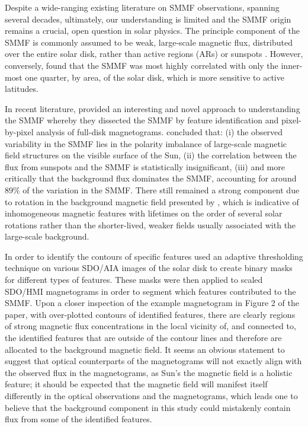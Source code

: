 Despite a wide-ranging existing literature on SMMF observations, spanning several decades, ultimately, our understanding is limited and the SMMF origin remains a crucial, open question in solar physics. The principle component of the SMMF is commonly assumed to be weak, large-scale magnetic flux, distributed over the entire solar disk, rather than active regions (ARs) or sunspots \citep{severny_time_1971, scherrer_mean_1977, xiang_ensemble_2016}. However, conversely, \citet{scherrer_mean_1972} found that the SMMF was most highly correlated with only the inner-most one quarter, by area, of the solar disk, which is more sensitive to active latitudes.

In recent literature, \citet{bose_variability_2018} provided an interesting and novel approach to understanding the SMMF whereby they dissected the SMMF by feature identification and pixel-by-pixel analysis of full-disk magnetograms. \citet{bose_variability_2018} concluded that: (i) the observed variability in the SMMF lies in the polarity imbalance of large-scale magnetic field structures on the visible surface of the Sun, (ii) the correlation between the flux from sunspots and the SMMF is statistically insignificant, (iii) and more critically that the background flux dominates the SMMF, accounting for around $89 \%$ of the variation in the SMMF. There still remained a strong component due to rotation in the background magnetic field presented by \citet{bose_variability_2018}, which is indicative of inhomogeneous magnetic features with lifetimes on the order of several solar rotations rather than the shorter-lived, weaker fields usually associated with the large-scale background. 

In order to identify the contours of specific features \citet{bose_variability_2018} used an adaptive thresholding technique on various SDO/AIA images of the solar disk to create binary masks for different types of features. These masks were then applied to scaled SDO/HMI magnetograms in order to segment which features contributed to the SMMF. Upon a closer inspection of the example magnetogram in Figure 2 of the paper, with over-plotted contours of identified features, there are clearly regions of strong magnetic flux concentrations in the local vicinity of, and connected to, the identified features that are outside of the contour lines and therefore are allocated to the background magnetic field. It seems an obvious statement to suggest that optical counterparts of the magnetograms will not exactly align with the observed flux in the magnetograms, as Sun's the magnetic field is a holistic feature; it should be expected that the magnetic field will manifest itself differently in the optical observations and the magnetograms, which leads one to believe that the background component in this study could mistakenly contain flux from some of the identified features.

